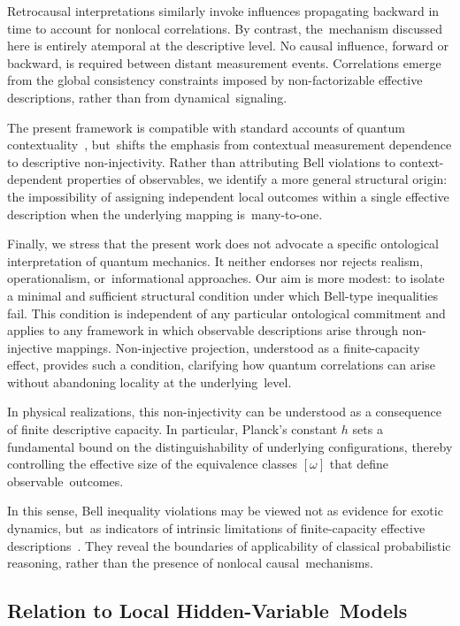 \documentclass[quantumrep,article,accept,pdftex,oneauthor]{Definitions/mdpi}
\theoremstyle{remark}
\begin{document}
  Retrocausal interpretations similarly invoke influences propagating backward in time
  to account for nonlocal correlations.
  By contrast, the~mechanism discussed here is entirely atemporal at the descriptive
  level.
  No causal influence, forward or backward, is required between distant measurement
  events.
  Correlations emerge from the global consistency constraints imposed by non-factorizable
  effective descriptions, rather than from dynamical~signaling.

  The present framework is compatible with standard accounts of quantum
  contextuality~\cite{KochenSpecker1967}, but~shifts the emphasis from contextual measurement
  dependence to descriptive non-injectivity.
  Rather than attributing Bell violations to context-dependent properties of observables,
  we identify a more general structural origin: the impossibility of assigning
  independent local outcomes within a single effective description when the underlying
  mapping is~many-to-one.

  Finally, we stress that the present work does not advocate a specific ontological
  interpretation of quantum mechanics.
  It neither endorses nor rejects realism, operationalism, or~informational approaches.
  Our aim is more modest: to isolate a minimal and sufficient structural condition under
  which Bell-type inequalities fail.
  This condition is independent of any particular ontological commitment and applies
  to any framework in which observable descriptions arise through non-injective mappings.
  Non-injective projection, understood as a finite-capacity effect, provides such a
  condition, clarifying how quantum correlations can arise without abandoning locality
  at the underlying~level.

  In physical realizations, this non-injectivity can be understood as a consequence
  of finite descriptive capacity.
  In particular, Planck's constant $h$ sets a fundamental bound on the
  distinguishability of underlying configurations, thereby controlling the effective
  size of the equivalence classes $[\omega]$ that define observable~outcomes.

  In this sense, Bell inequality violations may be viewed not as evidence for exotic
  dynamics, but~as indicators of intrinsic limitations of finite-capacity effective
  descriptions~\cite{Spekkens2007Epistemic}.
  They reveal the boundaries of applicability of classical probabilistic reasoning,
  rather than the presence of nonlocal causal~mechanisms.

  \subsection{Relation to Local Hidden-Variable~Models}
    \label{subsec:lhv-relation}
\end{document}
